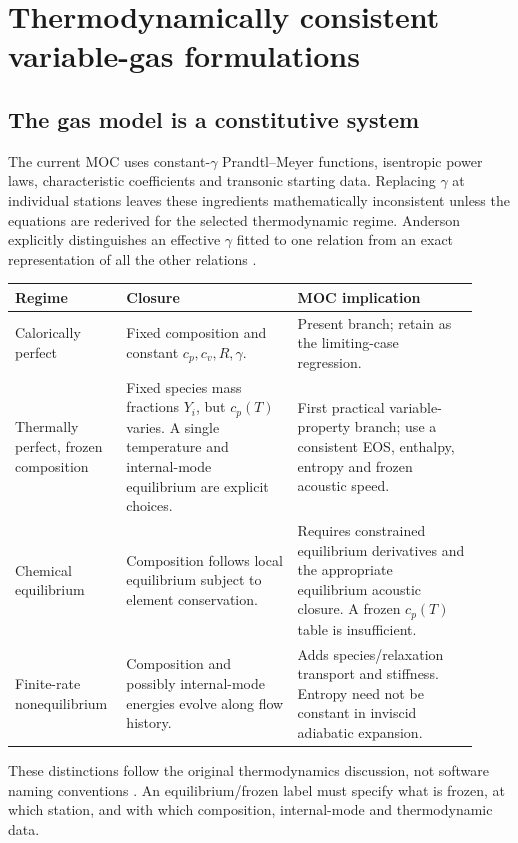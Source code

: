 \section{Thermodynamically consistent variable-gas formulations}
\label{sec:thermo}
\subsection{The gas model is a constitutive system}
The current MOC uses constant-\(\gamma\) Prandtl--Meyer functions,
isentropic power laws, characteristic coefficients and transonic starting
data. Replacing \(\gamma\) at individual stations leaves these ingredients
mathematically inconsistent unless the equations are rederived for the
selected thermodynamic regime. Anderson explicitly distinguishes an
effective \(\gamma\) fitted to one relation from an exact representation
of all the other relations \cite[\S17.6, PDF pp.~684--685]{anderson}.

\begin{longtable}{@{}P{0.20\linewidth}P{0.35\linewidth}P{0.37\linewidth}@{}}
\toprule\textbf{Regime} & \textbf{Closure} & \textbf{MOC implication}\\\midrule
\endhead
Calorically perfect &
Fixed composition and constant \(c_p,c_v,R,\gamma\). &
Present branch; retain as the limiting-case regression.\\
Thermally perfect, frozen composition &
Fixed species mass fractions \(Y_i\), but \(c_p(T)\) varies.
A single temperature and internal-mode equilibrium are explicit choices. &
First practical variable-property branch; use a consistent EOS,
enthalpy, entropy and frozen acoustic speed.\\
Chemical equilibrium &
Composition follows local equilibrium subject to element conservation. &
Requires constrained equilibrium derivatives and the appropriate
equilibrium acoustic closure. A frozen \(c_p(T)\) table is insufficient.\\
Finite-rate nonequilibrium &
Composition and possibly internal-mode energies evolve along flow history. &
Adds species/relaxation transport and stiffness. Entropy need not be
constant in inviscid adiabatic expansion.\\
\bottomrule
\end{longtable}

These distinctions follow the original thermodynamics discussion, not
software naming conventions \cite[\S\S17.4--17.9, PDF pp.~675--689]{anderson}.
An equilibrium/frozen label must specify what is frozen, at which station,
and with which composition, internal-mode and thermodynamic data.

